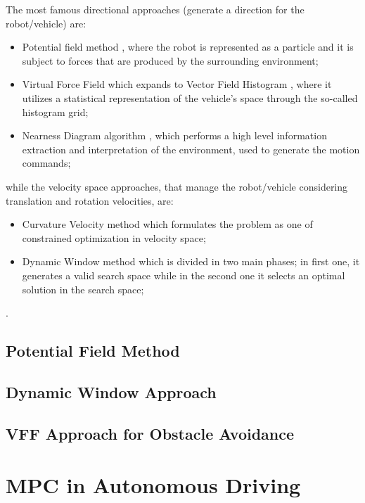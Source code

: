 The most famous directional approaches (generate a direction for the robot/vehicle) are:
\begin{itemize}
	\item Potential field method \cite{Khatib1986}, where the robot is represented as a particle and it is subject to forces that are produced by the surrounding environment;
	\item Virtual Force Field which expands to Vector Field Histogram \cite{Borenstein1991}, where it utilizes a statistical representation of the vehicle's space through the so-called histogram grid;
	\item Nearness Diagram algorithm \cite{Montano2000}, which  performs a high level information extraction and interpretation of the environment, used to generate the motion commands;
\end{itemize}
while the velocity space approaches, that manage the robot/vehicle considering translation and rotation velocities, are:
\begin{itemize}
	\item Curvature Velocity method \cite{Simmons1996} which formulates the problem as one of constrained optimization in velocity space;
	\item Dynamic Window method \cite{Fox1997} which is divided in two main phases; in first one, it generates a valid search space while in the second one it selects an optimal solution in the search space;
\end{itemize}
.
\subsection{Potential Field Method}
\subsection{Dynamic Window Approach}
\subsection{VFF Approach for Obstacle Avoidance}
\section{MPC in Autonomous Driving}
\cite{4651075}
\cite{vsantos2010}
\cite{borelli}
\cite{Skoda:Thesis:2016}